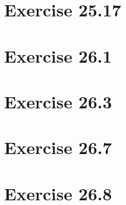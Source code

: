 \documentclass{article}
\begin{document}
\begin{center}
	
\end{center}


\section*{Exercise 25.17}



\section*{Exercise 26.1}



\section*{Exercise 26.3}



\section*{Exercise 26.7}



\section*{Exercise 26.8}


\end{document}
